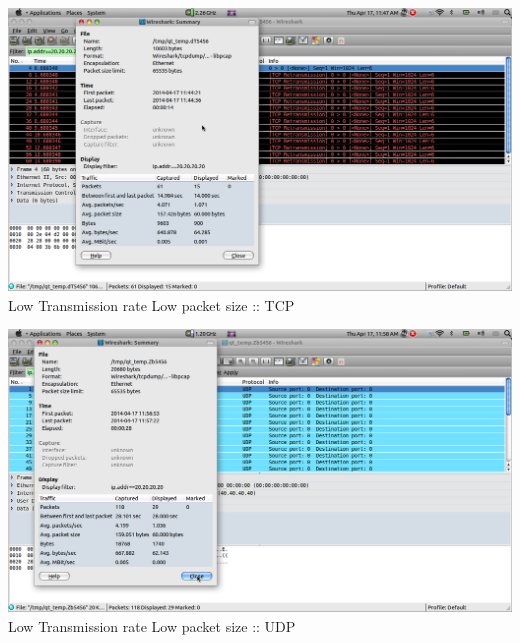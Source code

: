\documentclass[a4paper,12pt,oneside]{article}
\begin{document}
\begin{center}
 
\includegraphics[width=13 cm,height=12 cm]{./tcplow.png}
 Low Transmission rate Low packet size :: TCP  
\end{center}
 
\begin{center}
 
\includegraphics[width=13 cm,height=12 cm]{./udplow.png}
 Low Transmission rate Low packet size :: UDP 
\end{center}



 
 
\end{document}
